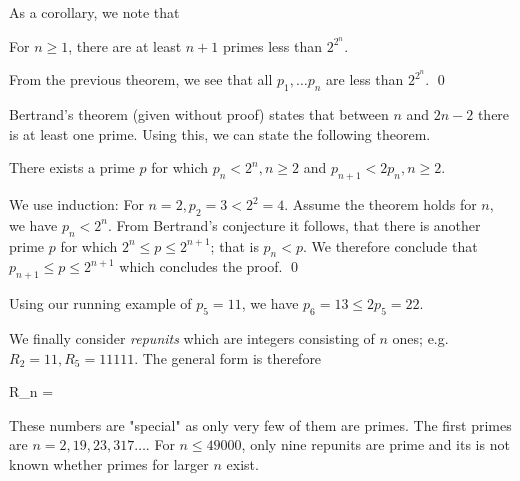 As a corollary, we note that

\begin{theorem}
    For $n \geq 1$, there are at least $n+1$ primes less than $2^{2^{n}}$.
\end{theorem}

From the previous theorem, we see that all $p_1, \ldots p_n$ are less than $2^{2^{n}}$. \qed

Bertrand's theorem (given without proof) states that between $n$ and $2n-2$ there is at least one prime. Using this, we can state the following theorem.

\begin{theorem}
    There exists a prime $p$ for which $p_n < 2^n, n \geq 2$ and $p_{n+1} < 2 p_n, n \geq 2$.
\end{theorem}

We use induction: For $n = 2, p_2 = 3 < 2^2 = 4$. Assume the theorem holds for $n$, we have $p_n < 2^n$. From Bertrand's conjecture it follows, that there is another prime $p$ for which $2^n \leq p \leq 2^{n+1}$; that is $p_n < p$. We therefore conclude that $p_{n+1} \leq p \leq 2^{n+1}$ which concludes the proof. \qed

Using our running example of $p_5 = 11$, we have $p_6 = 13 \leq 2 p_5 = 22$.

We finally consider \emph{repunits} which are integers consisting of $n$ ones; e.g. $R_2 = 11, R_5 =11111$. The general form is therefore

\bee
R_n = 
\eee

These numbers are "special" as only very few of them are primes. The first primes are $n = 2, 19, 23, 317 \ldots$. For $n \leq 49000$, only nine repunits are prime and its is not known whether primes for larger $n$ exist.



